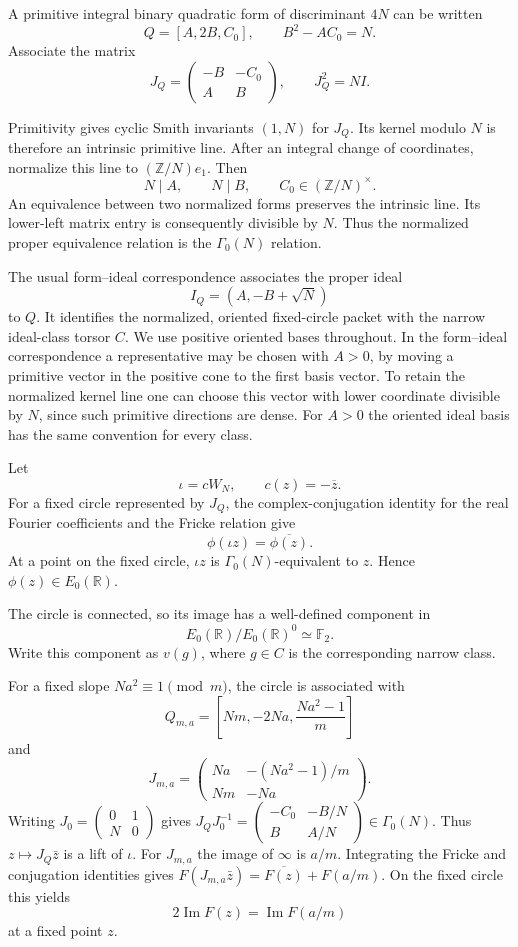 \documentclass[11pt]{article}
\begin{document}
A primitive integral binary quadratic form of
discriminant $4N$ can be written
\[
Q=[A,2B,C_0],\qquad B^2-AC_0=N.
\]
Associate the matrix
\[
J_Q=
\begin{pmatrix}
-B&-C_0\\ A&B
\end{pmatrix},
\qquad J_Q^2=NI.
\]

Primitivity gives cyclic Smith invariants
$(1,N)$ for $J_Q$. Its kernel modulo $N$
is therefore an intrinsic primitive line.
After an integral change of coordinates,
normalize this line to
$(\mathbb Z/N)e_1$. Then
\[
N\mid A,\qquad N\mid B,\qquad
C_0\in(\mathbb Z/N)^\times.
\]
An equivalence between two normalized forms
preserves the intrinsic line. Its lower-left
matrix entry is consequently divisible by $N$.
Thus the normalized proper equivalence relation
is the $\Gamma_0(N)$ relation.

The usual form--ideal correspondence associates
the proper ideal
\[
I_Q=(A,-B+\sqrt N)
\]
to $Q$. It identifies the normalized,
oriented fixed-circle packet with the narrow
ideal-class torsor $C$.
We use positive oriented bases throughout. In the form--ideal
correspondence a representative may be chosen with $A>0$, by
moving a primitive vector in the positive cone to the first basis
vector. To retain the normalized kernel line one can choose this
vector with lower coordinate divisible by $N$, since such primitive
directions are dense. For $A>0$ the oriented ideal basis has the
same convention for every class.

Let
\[
\iota=cW_N,\qquad c(z)=-\overline z.
\]
For a fixed circle represented by $J_Q$, the
complex-conjugation identity for the real
Fourier coefficients and the Fricke relation
give
\[
\phi(\iota z)=\overline{\phi(z)}.
\]
At a point on the fixed circle, $\iota z$ is
$\Gamma_0(N)$-equivalent to $z$. Hence
$\phi(z)\in E_0(\mathbb R)$.

The circle is connected, so its image has a
well-defined component in
\[
E_0(\mathbb R)/E_0(\mathbb R)^0
\simeq\mathbb F_2.
\]
Write this component as $v(g)$, where
$g\in C$ is the corresponding narrow class.

For a fixed slope $Na^2\equiv1\pmod m$,
the circle is associated with
\[
Q_{m,a}
=\left[Nm,-2Na,\frac{Na^2-1}{m}\right]
\]
and
\[
J_{m,a}=
\begin{pmatrix}
Na&-(Na^2-1)/m\\
Nm&-Na
\end{pmatrix}.
\]
Writing $J_0=\left(\begin{smallmatrix}0&1\\N&0\end{smallmatrix}\right)$
gives $J_QJ_0^{-1}=\left(\begin{smallmatrix}-C_0&-B/N\\B&A/N\end{smallmatrix}\right)\in\Gamma_0(N)$.
Thus $z\mapsto J_Q\bar z$ is a lift of $\iota$.
For $J_{m,a}$ the image of $\infty$ is $a/m$. Integrating
the Fricke and conjugation identities gives
$F(J_{m,a}\bar z)=\overline{F(z)}+F(a/m)$.
On the fixed circle this yields
\[
2\operatorname{Im}F(z)
=\operatorname{Im}F(a/m)
\]
at a fixed point $z$.
\end{document}
